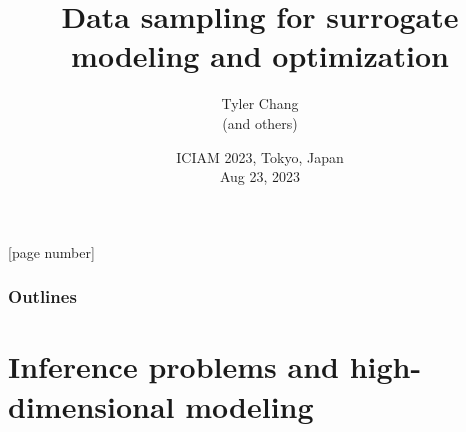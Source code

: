 \documentclass[aspectratio=169]{beamer}
\title{Data sampling for surrogate modeling and optimization}
\author{Tyler Chang\\
(and others)}
\date{ICIAM 2023, Tokyo, Japan\\
Aug 23, 2023}
\institute{Argonne National Laboratory}
\begin{document}
{
\frame{\titlepage}
}

[page number]{}

\begin{frame}
  \frametitle{Outlines}
  \tableofcontents
\end{frame}

\section{Inference problems and high-dimensional modeling}
\end{document}
